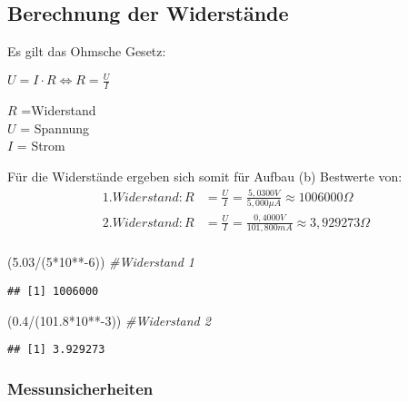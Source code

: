 \documentclass[
  9pt,
]{article}
\newenvironment{Shaded}{\begin{snugshade}}{\end{snugshade}}
\newcommand{\CommentTok}[1]{\textcolor[rgb]{0.56,0.35,0.01}{\textit{#1}}}
\newcommand{\DecValTok}[1]{\textcolor[rgb]{0.00,0.00,0.81}{#1}}
\newcommand{\FloatTok}[1]{\textcolor[rgb]{0.00,0.00,0.81}{#1}}
\newcommand{\NormalTok}[1]{#1}
\newcommand{\SpecialCharTok}[1]{\textcolor[rgb]{0.00,0.00,0.00}{#1}}
\begin{document}
\hypertarget{berechnung-der-widerstuxe4nde-1}{%
\subsection{Berechnung der
Widerstände}\label{berechnung-der-widerstuxe4nde-1}}

Es gilt das Ohmsche Gesetz:

\(U=I\cdot R \Leftrightarrow R = \frac{U}{I}\)

\noindent \(R\) =Widerstand\\
\noindent \(U\) = Spannung\\
\noindent \(I\) = Strom

Für die Widerstände ergeben sich somit für Aufbau (b) Bestwerte von:
\begin{equation*}
\begin{split}
1. Widerstand: R&=\frac{U}{I} = \frac {5,0300V}{5,000 \mu A} \approx 1006000 \Omega \\
2.Widerstand: R&=\frac{U}{I} = \frac {0,4000V}{101,800 mA} \approx 3,929273 \Omega \\
\end{split}
\end{equation*}

\begin{Shaded}
\begin{Highlighting}[]
\NormalTok{(}\FloatTok{5.03}\SpecialCharTok{/}\NormalTok{(}\DecValTok{5}\SpecialCharTok{*}\DecValTok{10}\SpecialCharTok{**{-}}\DecValTok{6}\NormalTok{)) }\CommentTok{\#Widerstand 1}
\end{Highlighting}
\end{Shaded}

\begin{verbatim}
## [1] 1006000
\end{verbatim}

\begin{Shaded}
\begin{Highlighting}[]
\NormalTok{(}\FloatTok{0.4}\SpecialCharTok{/}\NormalTok{(}\FloatTok{101.8}\SpecialCharTok{*}\DecValTok{10}\SpecialCharTok{**{-}}\DecValTok{3}\NormalTok{)) }\CommentTok{\#Widerstand 2}
\end{Highlighting}
\end{Shaded}

\begin{verbatim}
## [1] 3.929273
\end{verbatim}

\hypertarget{messunsicherheiten-3}{%
\subsubsection{Messunsicherheiten}\label{messunsicherheiten-3}}
\end{document}
